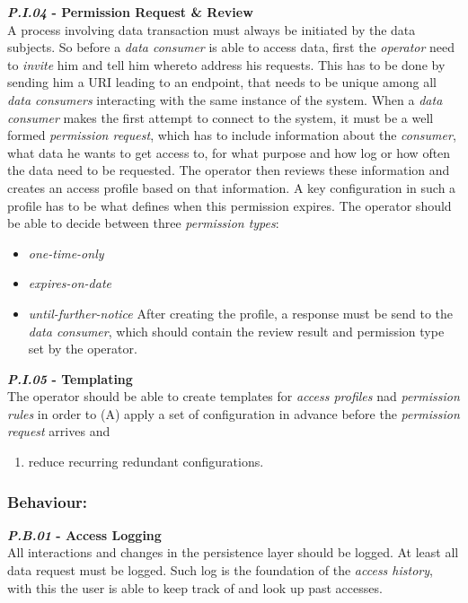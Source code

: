 \documentclass[12pt,english,a4paper,titlepage,cleardoublepage=empty,dottedtoc]{report}
\providecommand{\tightlist}{%
  \setlength{\itemsep}{0pt}\setlength{\parskip}{0pt}}
\begin{document}
\textbf{\emph{\protect\hypertarget{pi04}{}{P.I.04}} - Permission Request
\& Review}\\
A process involving data transaction must always be initiated by the
data subjects. So before a \emph{data consumer} is able to access data,
first the \emph{operator} need to \emph{invite} him and tell him whereto
address his requests. This has to be done by sending him a URI leading
to an endpoint, that needs to be unique among all \emph{data consumers}
interacting with the same instance of the system. When a \emph{data
consumer} makes the first attempt to connect to the system, it must be a
well formed \emph{permission request}, which has to include information
about the \emph{consumer}, what data he wants to get access to, for what
purpose and how log or how often the data need to be requested. The
operator then reviews these information and creates an access profile
based on that information. A key configuration in such a profile has to
be what defines when this permission expires. The operator should be
able to decide between three \emph{permission types}:

\begin{itemize}
\tightlist
\item
  \emph{one-time-only}
\item
  \emph{expires-on-date}
\item
  \emph{until-further-notice} After creating the profile, a response
  must be send to the \emph{data consumer}, which should contain the
  review result and permission type set by the operator.
\end{itemize}

\textbf{\emph{\protect\hypertarget{pi05}{}{P.I.05}} - Templating}\\
The operator should be able to create templates for \emph{access
profiles} nad \emph{permission rules} in order to (A) apply a set of
configuration in advance before the \emph{permission request} arrives
and

\begin{enumerate}
\def\labelenumi{(\Alph{enumi})}
\setcounter{enumi}{1}
\tightlist
\item
  reduce recurring redundant configurations.
\end{enumerate}

\subsubsection{Behaviour:}\label{behaviour}

\textbf{\emph{\protect\hypertarget{pb01}{}{P.B.01}} - Access Logging}\\
All interactions and changes in the persistence layer should be logged.
At least all data request must be logged. Such log is the foundation of
the \emph{access history}, with this the user is able to keep track of
and look up past accesses.
\end{document}
